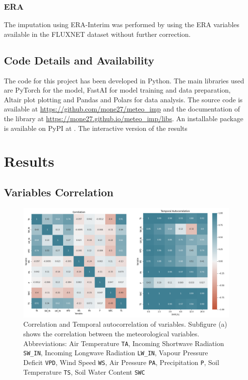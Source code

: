 \documentclass{article}
\let\Oldsection\section
\renewcommand{\section}{\FloatBarrier\Oldsection}
\let\Oldsubsection\subsection
\renewcommand{\subsection}{\FloatBarrier\Oldsubsection}
\begin{document}
\subsubsection{ERA} The imputation using ERA-Interim was performed by using the ERA variables available in the FLUXNET dataset without further correction.

\subsection{Code Details and Availability}

The code for this project has been developed in Python. The main libraries used are PyTorch for the model,  FastAI for model training and data preparation, Altair plot plotting and Pandas and Polars for data analysis. The source code is available at \url{https://github.com/mone27/meteo_imp} and the documentation of the library at \url{https://mone27.github.io/meteo_imp/libs}. An installable package is available on PyPI at . The interactive version of the results 

\section{Results}

\subsection{Variables Correlation}

\begin{figure}
    \centerline{\includegraphics[width=7in]{correlation}}
    \caption{Correlation and Temporal autocorrelation of variables. Subfigure (a) shows the correlation between the meteorological variables. Abbreviations: Air Temperature \texttt{TA}, Incoming Shortwave Radiation \texttt{SW\_IN}, Incoming Longwave Radiation \texttt{LW\_IN}, Vapour Pressure Deficit \texttt{VPD}, Wind Speed \texttt{WS}, Air Pressure \texttt{PA}, Precipitation \texttt{P}, Soil Temperature \texttt{TS}, Soil Water Content \texttt{SWC}}
    \label{fig:correlation}
\end{figure}
\end{document}
